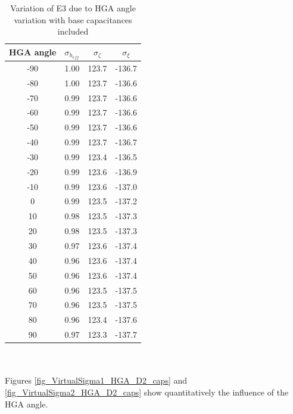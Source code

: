 \documentclass[a4paper,10pt]{thesis}
\begin{document}
\begin{table}
\centering
\caption{Variation of E3 due to HGA angle variation with base capacitances included}\label{tab_e3_var}
\begin{tabular}{|c|c|c|c|}
  \hline
HGA angle & $\sigma_{h_{eff}}$ & $\sigma_{\zeta}$ & $\sigma_{\xi}$ \\
\hline
-90 & 1.00 & 123.7 & -136.7 \\
-80 & 1.00 & 123.7 & -136.6\\
-70 & 0.99 & 123.7 & -136.6\\
-60 & 0.99 & 123.7 & -136.6\\
-50 & 0.99 & 123.7 & -136.6\\
-40 & 0.99 & 123.7 & -136.7\\
-30 & 0.99 & 123.4 & -136.5\\
-20 & 0.99 & 123.6 & -136.9\\
-10 & 0.99 & 123.6 & -137.0\\
0 & 0.99 & 123.5 &  -137.2\\
10 & 0.98 & 123.5 & -137.3\\
20 & 0.98 & 123.5 & -137.3\\
30 & 0.97 & 123.6 & -137.4\\
40 & 0.96 & 123.6 & -137.4 \\
50 & 0.96 & 123.6 & -137.4\\
60 & 0.96 & 123.5 & -137.5 \\
70 & 0.96 & 123.5 & -137.5 \\
80 & 0.96 & 123.4 & -137.6 \\
90 & 0.97 & 123.3 & -137.7 \\
\hline\end{tabular}\\
\end{table}
\paragraph*{}
Figures \ref{fig_VirtualSigma1_HGA_D2_caps} and \ref{fig_VirtualSigma2_HGA_D2_caps} show quantitatively the influence of the HGA angle.
\end{document}
